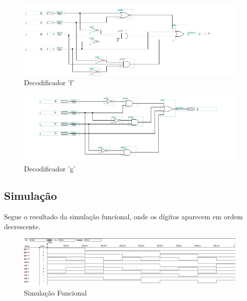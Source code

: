 \documentclass[a4paper]{article}
\begin{document}
\begin{figure}[h!]
  \centering
  \includegraphics[scale=0.7]{dec_f.png}
  \caption{Decodificador 'f'}
\end{figure}

\begin{figure}[h!]
  \centering
  \includegraphics[scale=0.7]{dec_g.png}
  \caption{Decodificador 'g'}
\end{figure}

\FloatBarrier
\subsection{Simulação}

Segue o resultado da simulação funcional, onde os dígitos aparecem em ordem decrescente.

\begin{figure}[h!]
  \centering
  \includegraphics[scale=0.4]{simulacao.png}
  \caption{Simulação Funcional}
\end{figure}



\FloatBarrier
\end{document}
